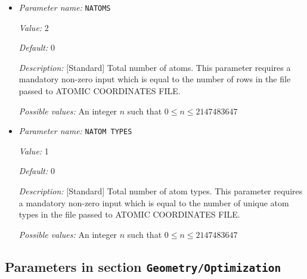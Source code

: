 \begin{itemize}
{\it Possible values:} Any string
\item {\it Parameter name:} {\tt NATOMS}
\label{parameters:Geometry/NATOMS}


{\it Value:} 2


{\it Default:} 0


{\it Description:} [Standard] Total number of atoms. This parameter requires a mandatory non-zero input which is equal to the number of rows in the file passed to ATOMIC COORDINATES FILE.


{\it Possible values:} An integer $n$ such that $0\leq n \leq 2147483647$
\item {\it Parameter name:} {\tt NATOM TYPES}
\label{parameters:Geometry/NATOM TYPES}
\label{parameters:Geometry/NATOM_20TYPES}


{\it Value:} 1


{\it Default:} 0


{\it Description:} [Standard] Total number of atom types. This parameter requires a mandatory non-zero input which is equal to the number of unique atom types in the file passed to ATOMIC COORDINATES FILE.


{\it Possible values:} An integer $n$ such that $0\leq n \leq 2147483647$
\end{itemize}



\subsection{Parameters in section \tt Geometry/Optimization}
\label{parameters:Geometry/Optimization}

